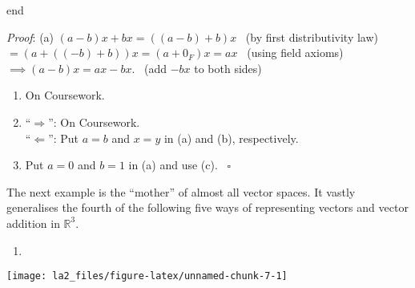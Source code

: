 \documentclass[
  12pt,
  a4paper,
  twoside]{article}
\providecommand{\tightlist}{%
  \setlength{\itemsep}{0pt}\setlength{\parskip}{0pt}}
\theoremstyle{plain}
\theoremstyle{definition}
\begin{document}
\csname end

\emph{Proof}:
(a) \((a-b)x + bx = ((a-b)+b)x\) \hfill~{(by first distributivity law)}\\
\hspace*{0.333em}\hspace*{0.333em}\hspace*{0.333em}\hspace*{0.333em}\hspace*{0.333em}\hspace*{0.333em}\hspace*{0.333em}\hspace*{0.333em}\hspace*{0.333em}\hspace*{0.333em}\(= \left(a+((-b)+b)\right)x=(a+0_F)x = ax\) \hfill~{(using field axioms)}\\
\hspace*{0.333em}\hspace*{0.333em}\hspace*{0.333em}\hspace*{0.333em}\hspace*{0.333em}\hspace*{0.333em}\(\implies (a-b)x = ax - bx\). \hfill~{(add \(-bx\) to both sides)}

\begin{enumerate}
\def\labelenumi{(\alph{enumi})}
\setcounter{enumi}{1}
\item
  On Coursework.
\item
  ``\(\Longrightarrow\)'': On Coursework.\\
  ``\(\Longleftarrow\)'': Put \(a=b\) and \(x=y\) in (a) and (b), respectively.
\item
  Put \(a=0\) and \(b=1\) in (a) and use (c). \hfill~{\(\square\)}
\end{enumerate}

The next example is the ``mother'' of almost all vector spaces.
It vastly generalises the fourth of the following five ways of representing vectors and vector addition in \(\mathbb{R}^{3}\).

\newpage

\begin{enumerate}
\def\labelenumi{(\Roman{enumi})}
\tightlist
\item
\end{enumerate}

\begin{center}\texttt{[image: la2\_files/figure-latex/unnamed-chunk-7-1]} \end{center}
\end{document}
